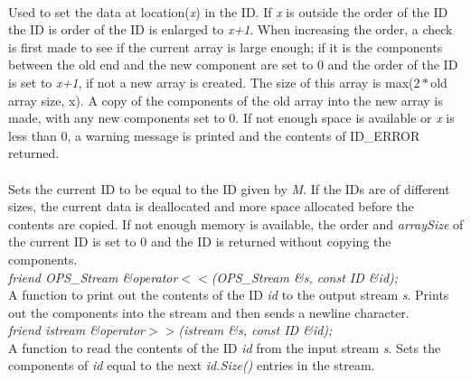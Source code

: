  \\
Used to set the data at location({\em x}) in the ID. If {\em x} is outside
the order of the ID the ID is order of the ID is enlarged to {\em
x+1}. When increasing the order, a check is first made to see if the
current array is large enough; if it is the components between the old
end and the new component are set to $0$ and the order of the ID is set
to {\em x+1}, if not a new array is created. The size of this array is
max($2*$old array size, x). A copy of the components of the old array
into the new array is made, with any new components set to $0$. If not
enough space is available or {\em x} is less than $0$, a warning
message is printed and the contents of ID\_ERROR returned. \\


\\
Sets the current ID to be equal to the ID given by {\em M}. If the
IDs are of different sizes, the current data is deallocated and
more space allocated before the contents are copied. If not enough
memory is available, the order and {\em arraySize} of the current ID
is set to $0$ and the ID is returned without copying the components. \\


{\em friend OPS_Stream \&operator$<<$(OPS_Stream \&s, const ID \&id);} \\
A function to print out the contents of the ID {\em id} to the output stream
{\em s}. Prints out the components into the stream and then sends a
newline character. \\

{\em friend istream \&operator$>>$(istream \&s, const ID \&id);} \\
A function to read the contents of the ID {\em id} from the input
stream {\em s}. Sets the components of {\em id} equal to the next {\em
id.Size()} entries in the stream.\\ 






